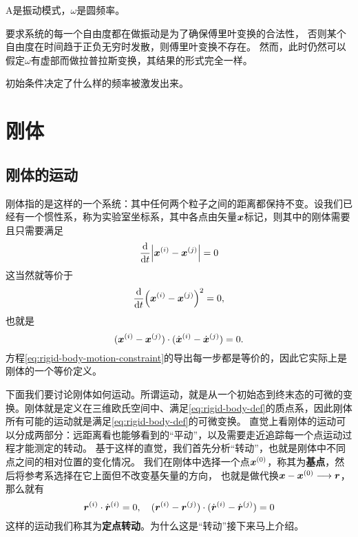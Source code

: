 \documentclass[UTF8, a4paper]{ctexart}
\begin{document}
A是振动模式，$\omega$是圆频率。

要求系统的每一个自由度都在做振动是为了确保傅里叶变换的合法性，
否则某个自由度在时间趋于正负无穷时发散，则傅里叶变换不存在。
然而，此时仍然可以假定$\omega$有虚部而做拉普拉斯变换，其结果的形式完全一样。

初始条件决定了什么样的频率被激发出来。

\section{刚体}

\subsection{刚体的运动}

刚体指的是这样的一个系统：其中任何两个粒子之间的距离都保持不变。设我们已经有一个惯性系，称为实验室坐标系，其中各点由矢量$\vb*{x}$标记，则其中的刚体需要且只需要满足
\begin{equation}
    \dv{t} \abs{\vb*{x}^{(i)} - \vb*{x}^{(j)}} = 0
    \label{eq:rigid-body-def}
\end{equation}
这当然就等价于
\[
    \dv{t} (\vb*{x}^{(i)} - \vb*{x}^{(j)})^2 = 0,
\]
也就是
\begin{equation}
    (\vb*{x}^{(i)} - \vb*{x}^{(j)}) \cdot (\dot{\vb*{x}}^{(i)} - \dot{\vb*{x}}^{(j)}) = 0.
    \label{eq:rigid-body-motion-constraint}
\end{equation}
方程\eqref{eq:rigid-body-motion-constraint}的导出每一步都是等价的，因此它实际上是刚体的一个等价定义。

下面我们要讨论刚体如何运动。所谓运动，就是从一个初始态到终末态的可微的变换。刚体就是定义在三维欧氏空间中、满足\eqref{eq:rigid-body-def}的质点系，因此刚体所有可能的运动就是满足\eqref{eq:rigid-body-def}的可微变换。
直觉上看刚体的运动可以分成两部分：远距离看也能够看到的“平动”，以及需要走近追踪每一个点运动过程才能测定的转动。
基于这样的直觉，我们首先分析“转动”，也就是刚体中不同点之间的相对位置的变化情况。
我们在刚体中选择一个点$\vb*{x}^{(0)}$，称其为\textbf{基点}，然后将参考系选择在它上面但不改变基矢量的方向，
也就是做代换$\vb*{x} - \vb*{x}^{(0)} \longrightarrow \vb*{r}$，
那么就有
\begin{equation}
    \vb*{r}^{(i)} \cdot {\dot{\vb*{r}}}^{(i)} = 0, \quad (\vb*{r}^{(i)} - \vb*{r}^{(j)}) \cdot (\dot{\vb*{r}}^{(i)} - \dot{\vb*{r}}^{(j)}) = 0
    \label{eq:around-a-point}
\end{equation}
这样的运动我们称其为\textbf{定点转动}。为什么这是“转动”接下来马上介绍。
\end{document}
